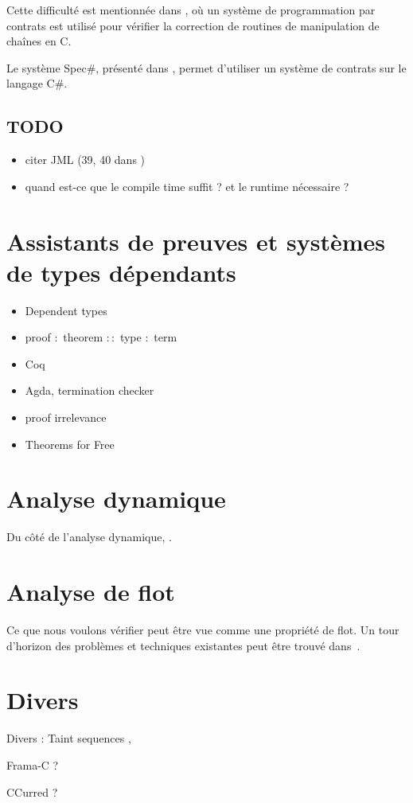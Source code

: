 Cette difficulté est mentionnée dans \cite{cssv}, où un système de programmation
par contrats est utilisé pour vérifier la correction de routines de manipulation
de chaînes en C.

Le système Spec\#, présenté dans \cite{krml136}, permet d'utiliser un système de
contrats sur le langage C\#.

\subsection*{TODO}

\begin{itemize}
\item
  citer JML (39, 40 dans \cite{krml136})
\item
  quand est-ce que le compile time suffit ? et le runtime nécessaire ?
\end{itemize}

\section{Assistants de preuves et systèmes de types dépendants}

\begin{itemize}
\item Dependent types
\item proof $:$ theorem $::$ type $:$ term
\item Coq
\item Agda, termination checker
\item proof irrelevance
\item Theorems for Free\cite{theoremsforfree}
\end{itemize}


\section{Analyse dynamique}

Du côté de l'analyse dynamique, \cite{oakland10}.

\section{Analyse de flot}

Ce que nous voulons vérifier peut être vue comme une propriété de flot. Un tour
d'horizon des problèmes et techniques existantes peut être trouvé
dans~\cite{sm-jsac03}.

\section{Divers}

Divers : Taint sequences \cite{mdv10},

Frama-C ?

CCurred ?
